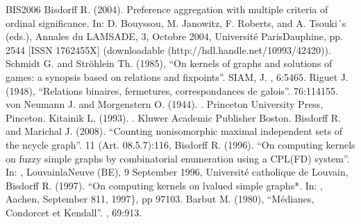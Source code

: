 \documentclass[a4paper,12pt,english]{sphinxhowto}
\begin{document}
\begin{sphinxthebibliography}{BIS\sphinxhyphen{}2006}
\sphinxAtStartPar
Bisdorff R. (2004). Preference aggregation with multiple criteria of ordinal significance. In: D. Bouyssou, M. Janowitz, F. Roberts, and A. Tsouki´s (eds.), Annales du LAMSADE, 3, Octobre 2004, Université Paris\sphinxhyphen{}Dauphine, pp. 25\sphinxhyphen{}44 {[}ISSN 1762\sphinxhyphen{}455X{]} (downloadable  (http://hdl.handle.net/10993/42420)).
\sphinxAtStartPar
Schmidt G. and Ströhlein Th. (1985), “On kernels of graphs and solutions of games: a synopsis based on relations and fixpoints”. SIAM, J. , 6:54\textendash{}65.
\sphinxAtStartPar
Riguet J. (1948), “Relations binaires, fermetures, correspondances de galois”.  76:114\textendash{}155.
\sphinxAtStartPar
von Neumann J. and Morgenstern O. (1944). . Princeton University Press, Pinceton.
\sphinxAtStartPar
Kitainik L. (1993). . Kluwer Academic Publisher Boston.
\sphinxAtStartPar
Bisdorff R. and Marichal J. (2008). “Counting non\sphinxhyphen{}isomorphic maximal independent sets
of the n\sphinxhyphen{}cycle graph”.  11 (Art. 08.5.7):1\textendash{}16, 
\sphinxAtStartPar
Bisdorff R. (1996). “On computing kernels on fuzzy simple graphs by combinatorial
enumeration using a CPL(FD) system”. In: , Louvain\sphinxhyphen{}la\sphinxhyphen{}Neuve (BE), 9 September 1996, Université catholique
de Louvain, 
\sphinxAtStartPar
Bisdorff R. (1997). “On computing kernels on l\sphinxhyphen{}valued simple graphs*. In:
, Aachen, September 8\sphinxhyphen{}11, 1997\}, pp 97\textendash{}103.
\sphinxAtStartPar
Barbut M. (1980), “Médianes, Condorcet et Kendall”. , 69:9\textendash{}13.

\end{sphinxthebibliography}
\end{document}
